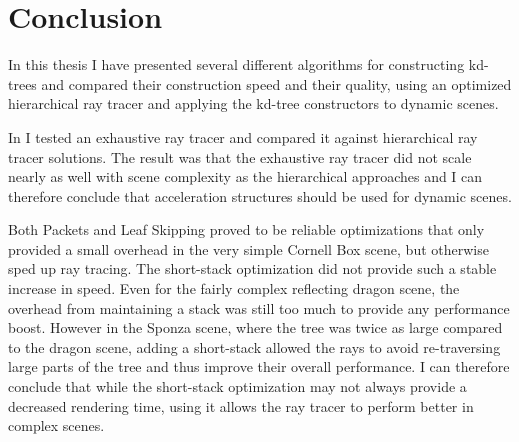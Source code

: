 




\chapter{Conclusion}


In this thesis I have presented several different algorithms for constructing
kd-trees and compared their construction speed and their quality, using an
optimized hierarchical ray tracer and applying the kd-tree constructors to
dynamic scenes.



In  I tested an exhaustive ray tracer and compared it
against hierarchical ray tracer solutions. The result was that the exhaustive
ray tracer did not scale nearly as well with scene complexity as the
hierarchical approaches and I can therefore conclude that acceleration
structures should be used for dynamic scenes.


Both Packets and Leaf Skipping proved to be reliable optimizations that only
provided a small overhead in the very simple Cornell Box scene, but otherwise
sped up ray tracing. The short-stack optimization did not provide such a stable
increase in speed. Even for the fairly complex reflecting dragon scene, the
overhead from maintaining a stack was still too much to provide any performance
boost. However in the Sponza scene, where the tree was twice as large compared
to the dragon scene, adding a short-stack allowed the rays to avoid
re-traversing large parts of the tree and thus improve their overall
performance. I can therefore conclude that while the short-stack optimization
may not always provide a decreased rendering time, using it allows the ray
tracer to perform better in complex scenes.


